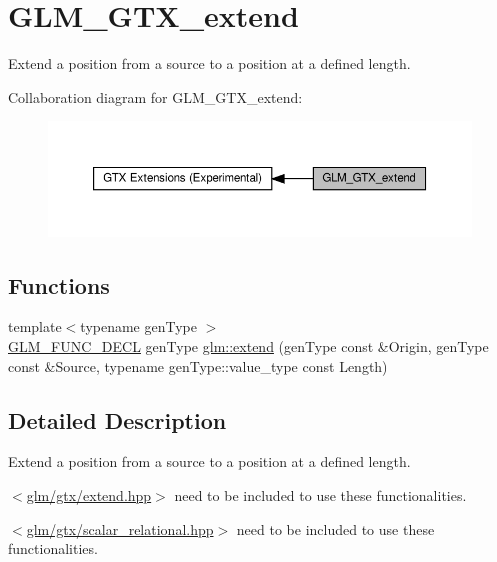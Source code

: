 \hypertarget{group__gtx__extend}{}\section{G\+L\+M\+\_\+\+G\+T\+X\+\_\+extend}
\label{group__gtx__extend}


Extend a position from a source to a position at a defined length.  


Collaboration diagram for G\+L\+M\+\_\+\+G\+T\+X\+\_\+extend\+:\nopagebreak
\begin{figure}[H]
\begin{center}
\leavevmode
\includegraphics[width=350pt]{group__gtx__extend}
\end{center}
\end{figure}
\subsection*{Functions}
\begin{DoxyCompactItemize}
\item 
{\footnotesize template$<$typename gen\+Type $>$ }\\\hyperlink{setup_8hpp_ab2d052de21a70539923e9bcbf6e83a51}{G\+L\+M\+\_\+\+F\+U\+N\+C\+\_\+\+D\+E\+CL} gen\+Type \hyperlink{group__gtx__extend_ga8140caae613b0f847ab0d7175dc03a37}{glm\+::extend} (gen\+Type const \&Origin, gen\+Type const \&Source, typename gen\+Type\+::value\+\_\+type const Length)
\end{DoxyCompactItemize}


\subsection{Detailed Description}
Extend a position from a source to a position at a defined length. 

$<$\hyperlink{extend_8hpp}{glm/gtx/extend.\+hpp}$>$ need to be included to use these functionalities.

$<$\hyperlink{scalar__relational_8hpp}{glm/gtx/scalar\+\_\+relational.\+hpp}$>$ need to be included to use these functionalities. 

